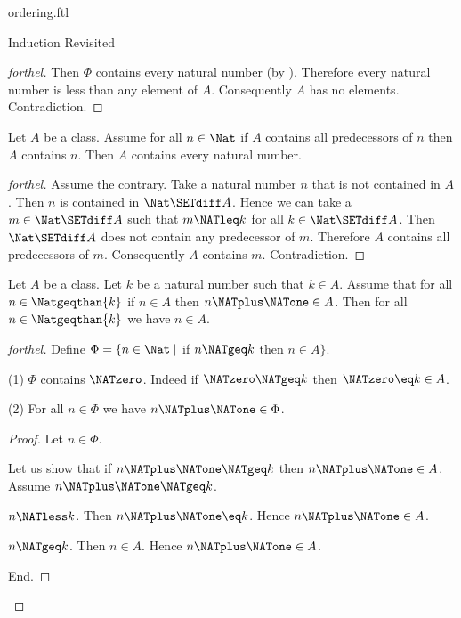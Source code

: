 \documentclass{naproche-library}
\begin{document}
\begin{smodule}[title=The Standard Ordering of the Natural Numbers]{ordering.ftl}
\begin{sfragment}{Induction Revisited}
\begin{proof}[forthel]
    Then $\Phi$ contains every natural number (by ).
    Therefore every natural number is less than any element of $A$.
    Consequently $A$ has no elements.
    Contradiction.
  \end{proof}

  \begin{theorem}[forthel,id=ARITHMETIC_04_3609801697263616]
    Let $A$ be a class.
    Assume for all $n \in \Nat$ if $A$ contains all predecessors of $n$ then $A$ contains $n$.
    Then $A$ contains every natural number.
  \end{theorem}
  \begin{proof}[forthel]
    Assume the contrary.
    Take a natural number $n$ that is not contained in $A$.
    Then $n$ is contained in $\Nat \SETdiff A$.
    Hence we can take a $m \in \Nat \SETdiff A$ such that $m \NATleq k$ for all $k \in \Nat \SETdiff A$.
    Then $\Nat \SETdiff A$ does not contain any predecessor of $m$.
    Therefore $A$ contains all predecessors of $m$.
    Consequently $A$ contains $m$.
    Contradiction.
  \end{proof}

  \begin{theorem}[forthel,id=ARITHMETIC_04_4976599269113856]
    Let $A$ be a class.
    Let $k$ be a natural number such that $k \in A$.
    Assume that for all $n \in \Natgeqthan{k}$ if $n \in A$ then $n \NATplus \NATone \in A$.
    Then for all $n \in \Natgeqthan{k}$ we have $n \in A$.
  \end{theorem}
  \begin{proof}[forthel]
    Define $\Phi = \{n \in \Nat \mid$ if $n \NATgeq k$ then $n \in A \}$.

    (1) $\Phi$ contains $\NATzero$.
    Indeed if $\NATzero \NATgeq k$ then $\NATzero \eq k \in A$.

    (2) For all $n \in \Phi$ we have $n \NATplus \NATone \in \Phi$.
    \begin{proof}
      Let $n \in \Phi$.

      Let us show that if $n \NATplus \NATone \NATgeq k$ then $n \NATplus \NATone \in A$.
        Assume $n \NATplus \NATone \NATgeq k$.

        \begin{case}{$n \NATless k$.}
          Then $n \NATplus \NATone \eq k$.
          Hence $n \NATplus \NATone \in A$.
        \end{case}

        \begin{case}{$n \NATgeq k$.}
          Then $n \in A$.
          Hence $n \NATplus \NATone \in A$.
        \end{case}
      End.


\end{proof}
\end{proof}
\end{sfragment}
\end{smodule}
\end{document}

